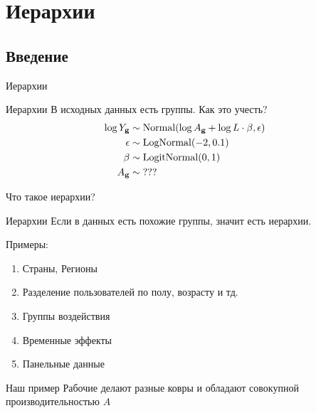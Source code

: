 \documentclass{beamer}
\begin{document}
\section{Иерархии}
\subsection{Введение}
\begin{frame}{}
    \centering \Huge Иерархии
\end{frame}
\begin{frame}{Иерархии}
В исходных данных есть группы. Как это учесть?
\begin{align*}
        \log Y_{\textbf{g}} &\sim \operatorname{Normal}(\log A_{\textbf{g}} + \log L \cdot \beta, {\epsilon})\\
        {\epsilon} &\sim \operatorname{LogNormal}(-2, 0.1)\\
        \beta &\sim \operatorname{LogitNormal}(0, 1)\\
        A_{\textbf{g}} &\sim \text{???}\\
    \end{align*}
\end{frame}
\begin{frame}{Что такое иерархии?}
    \begin{block}{Иерархии}
    Если в данных есть похожие группы, значит есть иерархии.
    \end{block}
    Примеры:
    \begin{enumerate}
        \item Страны, Регионы
        \item Разделение пользователей по полу, возрасту и тд.
        \item Группы воздействия
        \item Временные эффекты
        \item Панельные данные
    \end{enumerate}
    \begin{block}{Наш пример}
    Рабочие делают разные ковры и обладают совокупной производительностью $A$
    \end{block}
\end{frame}
\end{document}
